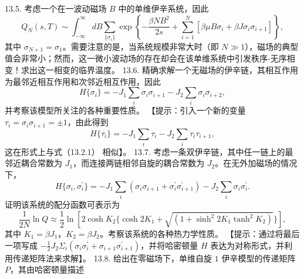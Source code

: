 13.5. 考虑一个在一波动磁场 \(B\) 中的单维伊辛系统，因此
\begin{equation}\tag{13.7.19}\label{eq:13.7.19}
Q _ { N } ( s , T ) \sim \int _ { - \infty } ^{\infty} d B \sum _ { \{ \sigma _ { i } \} } \exp \left\{ - \frac { \beta N B ^{2} } { 2 s } + \sum _ { i = 1 } ^{N} [ \beta \mu B \sigma _ { i } + \beta J \sigma _ { i } \sigma _ { i + 1 } ] \right\} ,
\end{equation}
其中 \(\sigma_{N+1} = \sigma_{1}\)。需要注意的是，当系统规模非常大时（即 \(N \gg 1\)），磁场的典型值会非常小；然而，这一微小波动场的存在却会在该单维系统中引发秩序-无序相变！求出这一相变的临界温度。
13.6. 精确求解一个无磁场的伊辛链，其相互作用为最邻近相互作用和次邻近相互作用，因此
\begin{equation}\tag{13.7.20}\label{eq:13.7.20}
H \{ \sigma _ { i } \} = - J _ { 1 } \sum _ { i } \sigma _ { i } \sigma _ { i + 1 } - J _ { 2 } \sum _ { i } \sigma _ { i } \sigma _ { i + 2 } ,
\end{equation}
并考察该模型所关注的各种重要性质。
【提示：引入一个新的变量 \(\tau_{i}=\sigma_{i}\sigma_{i+1}=\pm1\)，由此得到
\begin{equation}\tag{13.7.21}\label{eq:13.7.21}
H \{ \tau _ { i } \} = - J _ { 1 } \sum _ { i } \tau _ { i } - J _ { 2 } \sum _ { i } \tau _ { i } \tau _ { i + 1 } ,
\end{equation}
这在形式上与式（13.2.1） 相似】。
13.7. 考虑一条双伊辛链，其中任一链上的最邻近耦合常数为 \(J_1\)，而连接两链相邻自旋的耦合常数为 \(J_2\)。在无外加磁场的情况下，
\begin{equation}\tag{13.7.22}\label{eq:13.7.22}
H \{ \sigma _ { i } , \sigma _ { i } ^{\prime} \} = - J _ { 1 } \sum _ { i } ( \sigma _ { i } \sigma _ { i + 1 } + \sigma _ { i } ^{\prime} \sigma _ { i + 1 } ^{\prime} ) - J _ { 2 } \sum _ { i } \sigma _ { i } \sigma _ { i } ^{\prime} .
\end{equation}
证明该系统的配分函数可表示为
\begin{equation}\tag{13.7.23}\label{eq:13.7.23}
\frac { 1 } { 2 N } \ln Q \approx \frac { 1 } { 2 } \ln [ 2 \cosh K _ { 2 } \{ \cosh 2 K _ { 1 } + \sqrt { ( 1 + \sinh ^{2} 2 K _ { 1 } \operatorname { t a n h } ^{2} K _ { 2 } ) } \} ] ,
\end{equation}
其中 \(K_{1}=\beta J_{1}\)，\(K_{2}=\beta J_{2}\)。考察该系统的各种热力学性质。
【提示：通过将最后一项写成 \(-\frac{1}{2}J_{2}\Sigma_{i}(\sigma_{i}\sigma_{i}^{\prime}+\sigma_{i+1}\sigma_{i+1}^{\prime})\)，并将哈密顿量 \(H\) 表达为对称形式，并利用传递矩阵法来求解】。
13.8. 给出在零磁场下，单维自旋 \(1\) 伊辛模型的传递矩阵 \(P\)，其由哈密顿量描述
